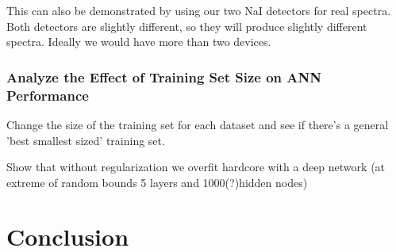 \documentclass[thesis,tocnosub,noragright,centerchapter,12pt,fullpage]{uiucecethesis09}
\begin{document}
    This can also be demonstrated by using our two NaI detectors for real spectra. Both detectors are slightly different, so they will produce slightly different spectra. Ideally we would have more than two devices.
    
\subsection{Analyze the Effect of Training Set Size on ANN Performance} 


    Change the size of the training set for each dataset and see if there's a general 'best smallest sized' training set.
    
    


Show  that  without  regularization  we  overfit  hardcore  with a deep network (at extreme of random bounds 5 layers and 1000(?)hidden nodes)








\chapter{Conclusion}



\end{document}
